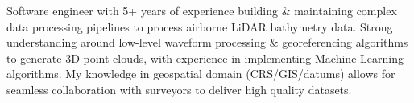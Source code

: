 \begin{justify}
Software engineer with 5+ years of experience building \& maintaining complex data processing pipelines to process airborne LiDAR bathymetry data. Strong understanding around low-level waveform processing \& georeferencing algorithms to generate 3D point-clouds, with experience in implementing Machine Learning algorithms. My knowledge in geospatial domain (CRS/GIS/datums) allows for seamless collaboration with surveyors to deliver high quality datasets.
\end{justify}